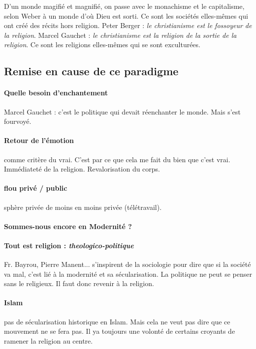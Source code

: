 \begin{Synthesis}
D'un monde magifié et magnifié, on passe avec le monachisme et le capitalisme, selon Weber à un monde d'où Dieu est sorti. Ce sont les sociétés elles-mêmes qui ont créé des récits hors religion.  
Peter Berger : \textit{le christianisme est le fossoyeur de la religion}. Marcel Gauchet : \textit{le christianisme est la religion de la sortie de la religion}. Ce sont les religions elles-mêmes qui se sont exculturées.
\end{Synthesis}


\subsection{Remise en cause de ce paradigme}
\paragraph{Quelle besoin d'enchantement } Marcel Gauchet : c'est le politique qui devait réenchanter le monde. Mais s'est fourvoyé. 

\paragraph{Retour de l'émotion} comme critère du vrai. C'est par ce que cela me fait du bien que c'est vrai. Immédiateté de la religion. Revalorisation du corps. 

\paragraph{flou privé / public} sphère privée de moins en moins privée (télétravail).

\paragraph{Sommes-nous encore en Modernité ?}




\paragraph{Tout est religion : \textit{theologico-politique}} Fr. Bayrou, Pierre Manent... s'inspirent de la sociologie pour dire que si la société va mal, c'est lié à la modernité et sa sécularisation. La politique ne peut se penser sans le religieux. Il faut donc revenir à la religion. 

\paragraph{Islam} pas de sécularisation historique en Islam. Mais cela ne veut pas dire que ce mouvement ne se fera pas.  Il ya toujours une volonté de certains croyants de ramener la religion au centre. 








